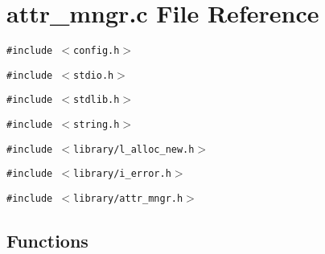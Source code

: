 \section{attr\_\-mngr.c File Reference}
\label{attr__mngr_8c}
{\tt \#include $<$config.h$>$}\par
{\tt \#include $<$stdio.h$>$}\par
{\tt \#include $<$stdlib.h$>$}\par
{\tt \#include $<$string.h$>$}\par
{\tt \#include $<$library/l\_\-alloc\_\-new.h$>$}\par
{\tt \#include $<$library/i\_\-error.h$>$}\par
{\tt \#include $<$library/attr\_\-mngr.h$>$}\par
\subsection*{Functions}
